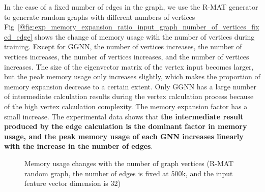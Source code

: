 In the case of a fixed number of edges in the graph, we use the R-MAT generator to generate random graphs with different numbers of vertices
Fig~\ref{@fig:exp_memory_expansion_ratio_input_graph_number_of_vertices_fixed_edge} shows the change of memory usage with the number of vertices during training.
Except for GGNN, the number of vertices increases, the number of vertices increases, the number of vertices increases,
and the number of vertices increases. The size of the eigenvector matrix of the vertex input becomes larger, 
but the peak memory usage only increases slightly, which makes the proportion of memory expansion decrease to a certain extent. 
Only GGNN has a large number of intermediate calculation results during the vertex calculation process because of the high vertex calculation complexity. 
The memory expansion factor has a small increase. The experimental data shows that \textbf{the intermediate result produced by the edge calculation is the dominant factor
in memory usage, and the peak memory usage of each GNN increases linearly with the increase in the number of edges}.

\begin{figure}
    \centering
    \caption{Memory usage changes with the number of graph vertices (R-MAT random graph, the number of edges is fixed at 500k, and the input feature vector dimension is 32)}
    \label{fig:exp_memory_expansion_ratio_input_graph_number_of_vertices_fixed_edge}
\end{figure}

